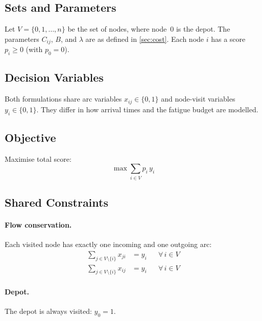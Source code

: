 \documentclass[preprint,11pt]{elsarticle}
\begin{document}
\subsection{Sets and Parameters}

Let $V = \{0, 1, \ldots, n\}$ be the set of nodes, where node~0 is the depot.
The parameters $C_{ij}$, $B$, and $\lambda$ are as defined in \cref{sec:cost}.
Each node $i$ has a score $p_i \geq 0$ (with $p_0 = 0$).

\subsection{Decision Variables}

Both formulations share arc variables $x_{ij} \in \{0,1\}$ and node-visit variables $y_i \in \{0,1\}$.
They differ in how arrival times and the fatigue budget are modelled.

\subsection{Objective}

Maximise total score:
\begin{equation}
  \max \sum_{i \in V} p_i \, y_i
  \label{eq:obj}
\end{equation}

\subsection{Shared Constraints}

\paragraph{Flow conservation.}
Each visited node has exactly one incoming and one outgoing arc:
\begin{align}
  \sum_{j \in V \setminus \{i\}} x_{ji} &= y_i && \forall\, i \in V \label{eq:inflow} \\
  \sum_{j \in V \setminus \{i\}} x_{ij} &= y_i && \forall\, i \in V \label{eq:outflow}
\end{align}

\paragraph{Depot.}
The depot is always visited: $y_0 = 1$.
\end{document}
